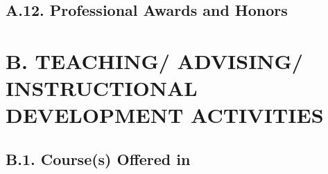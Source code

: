 \documentclass[10pt]{article}
\newcommand{\junk}[1]{}
\begin{document}


\subsection*{A.12. Professional Awards and Honors}






\junk{
\subsection*{A.13. Other Activities}


}

\section*{B. TEACHING/ ADVISING/ INSTRUCTIONAL DEVELOPMENT ACTIVITIES}


\subsection*{B.1. Course(s) Offered in \the\year}



\junk{
\subsection*{B.2. New teaching approaches and methods}

}
\end{document}
